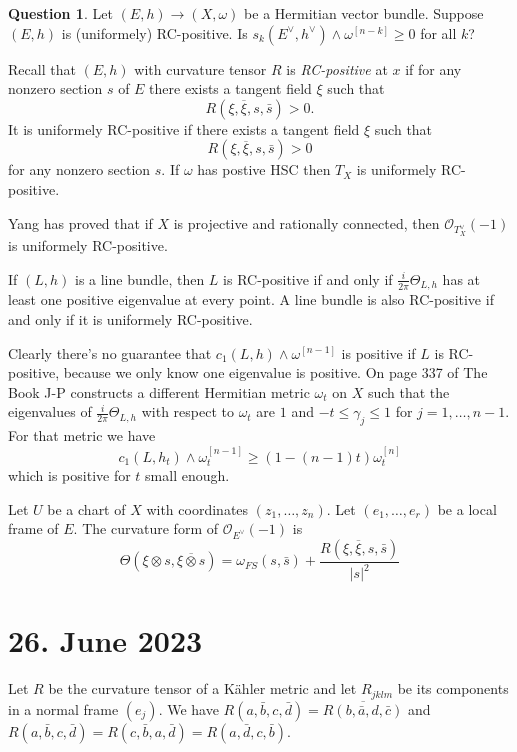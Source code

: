 \documentclass[11pt]{amsart}
\theoremstyle{definition}
\newcommand{\cc}[1]{\mathcal{#1}}
\def\^#1{^{[#1]}}
\def\ov#1{\overline{#1}}
\newtheorem{question}{Question}
\begin{document}
\begin{question}
Let $(E,h) \to (X,\omega)$ be a Hermitian vector bundle.
Suppose $(E,h)$ is (uniformely) RC-positive.
Is $s_k(E^\vee, h^\vee) \wedge \omega\^{n-k} \geq 0$ for all $k$?
\end{question}

Recall that $(E,h)$ with curvature tensor $R$ is \emph{RC-positive} at $x$ if
for any nonzero section $s$ of $E$ there exists a tangent field $\xi$ such that
$$
R(\xi, \ov\xi, s, \bar s) > 0.
$$
It is uniformely RC-positive if there exists a tangent field $\xi$ such that
$$
R(\xi, \ov\xi, s, \bar s) > 0
$$
for any nonzero section $s$.
If $\omega$ has postive HSC then $T_X$ is uniformely RC-positive.

Yang has proved that if $X$ is projective and rationally connected, then
$\cc O_{T_X^\vee}(-1)$ is uniformely RC-positive.

If $(L,h)$ is a line bundle, then $L$ is RC-positive if and only if $\frac
i{2\pi} \Theta_{L,h}$ has at least one positive eigenvalue at every point.
A line bundle is also RC-positive if and only if it is uniformely RC-positive.

Clearly there's no guarantee that $c_1(L,h) \wedge \omega\^{n-1}$ is positive
if $L$ is RC-positive, because we only know one eigenvalue is positive.
On page 337 of The Book J-P constructs a different Hermitian metric $\omega_t$
on $X$ such that the eigenvalues of $\frac{i}{2\pi}\Theta_{L,h}$ with respect
to $\omega_t$ are $1$ and $-t \leq \gamma_j \leq 1$ for $j
= 1, \ldots, n-1$. For that metric we have
$$
c_1(L,h_t) \wedge \omega_t\^{n-1} \geq (1-(n-1)t) \omega_t\^n
$$
which is positive for $t$ small enough.


Let $U$ be a chart of $X$ with coordinates $(z_1, \ldots, z_n)$.
Let $(e_1, \ldots, e_r)$ be a local frame of $E$.
The curvature form of $\cc O_{E^\vee}(-1)$ is
$$
\Theta(\xi \otimes s, \ov{\xi \otimes s})
= \omega_{FS}(s, \bar s) + \frac{R(\xi, \ov\xi, s, \bar s)}{|s|^2}
$$


\section{26. June 2023}

Let $R$ be the curvature tensor of a K\"ahler metric and let $R_{jklm}$ be
its components in a normal frame $(e_j)$.
We have $R(a, \bar b, c, \bar d) = \ov{R(b, \bar a, d, \bar c)}$
and $R(a, \bar b, c, \bar d) = R(c, \bar b, a, \bar d) = R(a, \bar d, c, \bar b)$.
\end{document}
